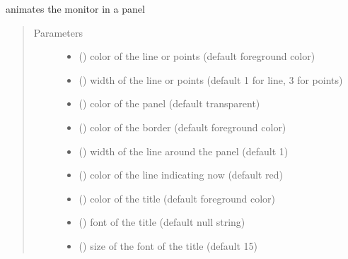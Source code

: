 \documentclass[letterpaper,10pt,english]{sphinxmanual}
\begin{document}
\begin{fulllineitems}
\begin{quote}
\begin{description}
\end{description}\end{quote}

\begin{fulllineitems}
\label{\detokenize{Reference:salabim.Monitor.animate}}
animates the monitor in a panel
\begin{quote}\begin{description}
\item[{Parameters}] \leavevmode\begin{itemize}
\item {} 
 () \textendash{} color of the line or points (default foreground color)

\item {} 
 () \textendash{} width of the line or points (default 1 for line, 3 for points)

\item {} 
 () \textendash{} color of the panel (default transparent)

\item {} 
 () \textendash{} color of the border (default foreground color)

\item {} 
 () \textendash{} width of the line around the panel (default 1)

\item {} 
 () \textendash{} color of the line indicating now (default red)

\item {} 
 () \textendash{} color of the title (default foreground color)

\item {} 
 ({\hyperref[\detokenize{Reference:salabim.Animate.font}]{}}) \textendash{} font of the title (default null string)

\item {} 
 () \textendash{} size of the font of the title (default 15)


\end{itemize}
\end{description}
\end{quote}
\end{fulllineitems}
\end{fulllineitems}
\end{document}
